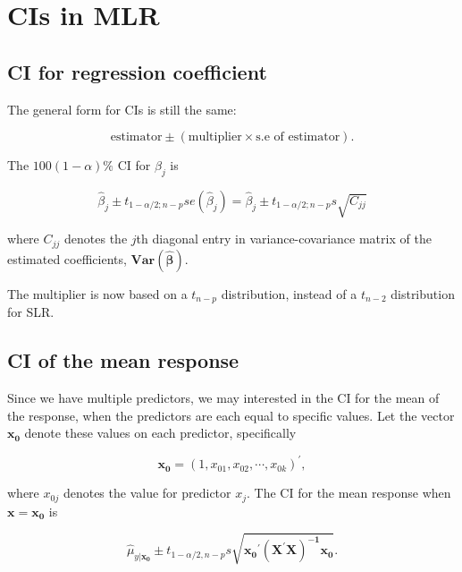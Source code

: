 \documentclass[
]{book}
\begin{document}
\hypertarget{cis-in-mlr}{%
\section{CIs in MLR}\label{cis-in-mlr}}

\hypertarget{ci-for-regression-coefficient}{%
\subsection{CI for regression coefficient}\label{ci-for-regression-coefficient}}

The general form for CIs is still the same:

\begin{equation}
\mbox{estimator} \pm (\mbox{multiplier} \times \mbox{s.e of estimator}). 
\label{eq:6CI}
\end{equation}

The \(100(1-\alpha)\%\) CI for \(\beta_j\) is

\begin{equation} 
\hat{\beta}_j \pm t_{1-\alpha/2;n-p}  se(\hat{\beta}_j) = \hat{\beta}_j \pm t_{1-\alpha/2;n-p} s \sqrt{C_{jj}}
\label{eq:6CIb}
\end{equation}

where \(C_{jj}\) denotes the \(j\)th diagonal entry in variance-covariance matrix of the estimated coefficients, \(\boldsymbol{Var}\left(\boldsymbol{\hat{\beta}}\right)\).

The multiplier is now based on a \(t_{n-p}\) distribution, instead of a \(t_{n-2}\) distribution for SLR.

\hypertarget{ci-of-the-mean-response-1}{%
\subsection{CI of the mean response}\label{ci-of-the-mean-response-1}}

Since we have multiple predictors, we may interested in the CI for the mean of the response, when the predictors are each equal to specific values. Let the vector \(\boldsymbol{x_0}\) denote these values on each predictor, specifically

\[
\boldsymbol{x_0} = (1, x_{01}, x_{02}, \cdots, x_{0k})^{\prime},
\]

where \(x_{0j}\) denotes the value for predictor \(x_j\). The CI for the mean response when \(\boldsymbol{x} = \boldsymbol{x_0}\) is

\begin{equation}
\hat{\mu}_{y|\boldsymbol{x_0}}\pm t_{1-\alpha/2,n-p}s\sqrt{\boldsymbol{x_0}^{\prime} \boldsymbol{(X^\prime X)^{-1}} \boldsymbol{x_0}}.
\label{eq:6CImean}
\end{equation}
\end{document}
